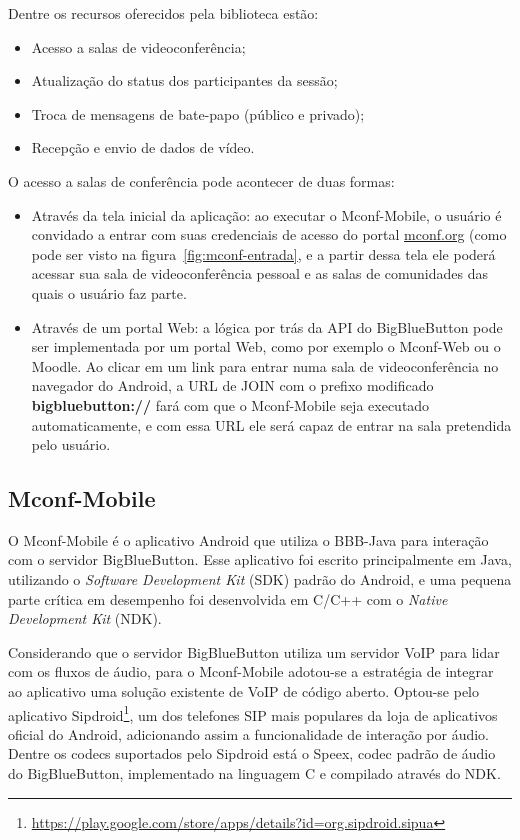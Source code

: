 \documentclass{acm_proc_article-sp}
\begin{document}
Dentre os recursos oferecidos pela biblioteca estão:
\begin{itemize}
 \item Acesso a salas de videoconferência;
 \item Atualização do status dos participantes da sessão;
 \item Troca de mensagens de bate-papo (público e privado);
 \item Recepção e envio de dados de vídeo.
\end{itemize}

O acesso a salas de conferência pode acontecer de duas formas:
\begin{itemize}
 \item Através da tela inicial da aplicação: ao executar o Mconf-Mobile, o usuário é convidado a entrar com suas credenciais de acesso do portal \url{mconf.org} (como pode ser visto na figura~\ref{fig:mconf-entrada}, e a partir dessa tela ele poderá acessar sua sala de videoconferência pessoal e as salas de comunidades das quais o usuário faz parte.
 \item Através de um portal Web: a lógica por trás da API do BigBlueButton pode ser implementada por um portal Web, como por exemplo o Mconf-Web ou o Moodle. Ao clicar em um link para entrar numa sala de videoconferência no navegador do Android, a URL de JOIN com o prefixo modificado \textbf{bigbluebutton://} fará com que o Mconf-Mobile seja executado automaticamente, e com essa URL ele será capaz de entrar na sala pretendida pelo usuário.
\end{itemize}

\subsection{Mconf-Mobile}\label{subsec:bbb-android}

O Mconf-Mobile é o aplicativo Android que utiliza o BBB-Java para interação com o servidor BigBlueButton. Esse aplicativo foi escrito principalmente em Java, utilizando o \emph{Software Development Kit} (SDK) padrão do Android, e uma pequena parte crítica em desempenho foi desenvolvida em C/C++ com o \emph{Native Development Kit} (NDK).

Considerando que o servidor BigBlueButton utiliza um servidor VoIP para lidar com os fluxos de áudio, para o Mconf-Mobile adotou-se a estratégia de integrar ao aplicativo uma solução existente de VoIP de código aberto. Optou-se pelo aplicativo Sipdroid\footnote{\url{https://play.google.com/store/apps/details?id=org.sipdroid.sipua}}, um dos telefones SIP mais populares da loja de aplicativos oficial do Android, adicionando assim a funcionalidade de interação por áudio. Dentre os codecs suportados pelo Sipdroid está o Speex, codec padrão de áudio do BigBlueButton, implementado na linguagem C e compilado através do NDK.
\end{document}
